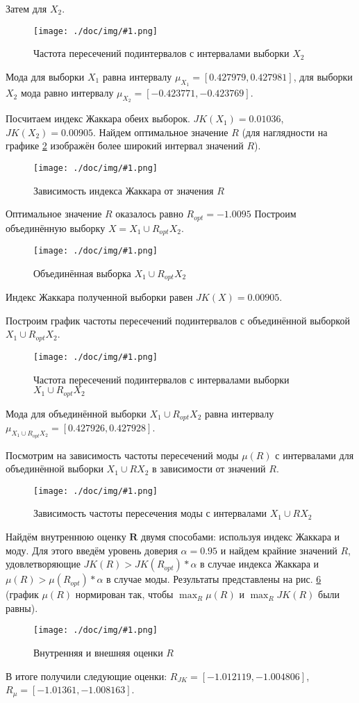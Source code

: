 \documentclass[a4paper,12pt]{article}
\newcommand{\plot}[3]{
    \begin{figure}[H]
        \begin{center}
            \texttt{[image: ./doc/img/\#1.png]}
            \caption{#2}
            \label{#3}
        \end{center}
    \end{figure}
}
\begin{document}
    Затем для $ X_2 $.
    \plot{_ModaX2Hist}{Частота пересечений подинтервалов с интервалами выборки $ X_2 $}{p:modaX2}

    Мода для выборки $ X_1 $ равна интервалу $ \mu_{X_1} = [0.427979, 0.427981] $,
    для выборки $ X_2 $ мода равно интервалу $ \mu_{X_2} = [-0.423771, -0.423769] $.

    Посчитаем индекс Жаккара обеих выборок. $ JK(X_1) = 0.01036 $, $ JK(X_2) = 0.00905 $.
    Найдем оптимальное значение $ R $
    (для наглядности на графике \ref{p:jaccard} изображён более широкий интервал значений $ R $).
    \plot{_Jaccard}{Зависимость индекса Жаккара от значения $R$}{p:jaccard}

    Оптимальное значение $ R $ оказалось равно $ R_{opt} = -1.0095 $
    Построим объединённую выборку $ X = X_1 \cup R_{opt} X_2 $.
    \plot{_X1RX2}{Объединённая выборка $ X_1 \cup R_{opt} X_2 $}{p:x1rx2}

    Индекс Жаккара полученной выборки равен $ JK(X) = 0.00905 $.

    Построим график частоты пересечений подинтервалов с объединённой выборкой
    $ X_1 \cup R_{opt} X_2 $.
    \plot{_ModaX1RX2Hist}{Частота пересечений подинтервалов с интервалами выборки $ X_1 \cup R_{opt} X_2 $}{p:moadX2RX2}

    Мода для объединённой выборки $ X_1 \cup R_{opt} X_2 $ равна интервалу $ \mu_{X_1 \cup R_{opt} X_2} =  [0.427926, 0.427928] $.

    Посмотрим на зависимость частоты пересечений моды $ \mu(R) $ с интервалами
    для объединённой выборки $ X_1 \cup R X_2 $ в зависимости от значений $ R $.
    \plot{_ModaR}{Зависимость частоты пересечения моды с интервалами $ X_1 \cup R X_2 $}{p:modaR}

    Найдём внутреннюю оценку $ \textbf{R} $ двумя способами: используя индекс Жаккара и моду.
    Для этого введём уровень доверия $ \alpha = 0.95 $ и найдем крайние значений $ R $,
    удовлетворяющие $ JK(R) > JK(R_{opt}) * \alpha $ в случае индекса Жаккара
    и $ \mu(R) > \mu(R_{opt}) * \alpha $ в случае моды.
    Результаты представлены на рис. \ref{p:InnerOuter}
    (график $ \mu(R) $ нормирован так, чтобы $ \max_R{\mu(R)} $ и $ \max_R{JK(R)} $ были равны).
    \plot{_InnerOuter}{Внутренняя и внешняя оценки $ R $}{p:InnerOuter} 

    В итоге получили следующие оценки: $ R_{JK} = [-1.012119, -1.004806] $,
    $ R_{\mu} = [-1.01361, -1.008163] $.
\end{document}
